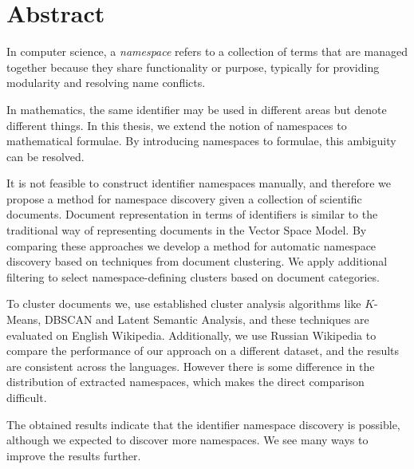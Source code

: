 \section*{Abstract}


In computer science, a \emph{namespace} refers to a collection of
terms that are managed together because they share functionality or
purpose, typically for providing modularity and resolving name conflicts.

In mathematics, the same identifier may be used in different areas
but denote different things. 
In this thesis, we extend the notion of namespaces to mathematical formulae.
By introducing namespaces to
formulae, this ambiguity can be resolved. 

It is not feasible to construct identifier namespaces manually,
and 
therefore we propose a method for namespace discovery given a collection
of scientific documents.
Document representation in terms 
of identifiers is similar to the traditional way of representing documents
in the Vector Space Model. 
By comparing these %
approaches we develop a method
for automatic namespace discovery based on techniques from
document clustering. 
We apply additional filtering to select namespace-defining clusters based on 
document categories. %

To cluster documents we, use established cluster analysis algorithms like
$K$-Means, DBSCAN and Latent Semantic Analysis, and these techniques
are evaluated on English Wikipedia. Additionally, we use Russian
Wikipedia to compare the performance of our approach on a different dataset, and
the results are consistent across the languages. However there is some difference
in the distribution of extracted namespaces, which makes the direct 
comparison difficult. 

The obtained results indicate that the identifier namespace discovery is
possible, although we expected to discover more namespaces. We see many ways 
to improve the results further.
